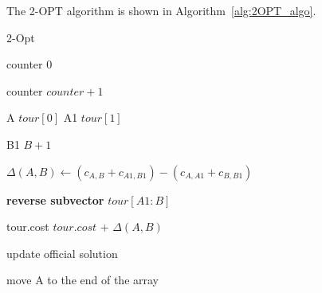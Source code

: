 %         
%         

\newpage

\noindent The 2-OPT algorithm is shown in Algorithm~\ref{alg:2OPT_algo}.

\begin{algorithm}[H]
    \caption{2-Opt}
    \label{alg:2OPT_algo}
    \begin{spacing}{1.3}
        \BlankLine
        counter \leftarrow $0$\;

        {
            counter \leftarrow $counter + 1$\;

            A \leftarrow $tour[0]$\;
            A1 \leftarrow $tour[1]$\;
            \BlankLine
            {
                B1 \leftarrow $B + 1$\;

                $\Delta(A,B) \leftarrow (c_{A,B} + c_{A1,B1}) - (c_{A,A1} + c_{B,B1})$\;
                \BlankLine
                {
                    \textbf{reverse subvector} $tour[A1 : B]$

                    tour.cost \leftarrow $tour.cost$ + $\Delta(A,B)$

                    {
                        update official solution\;
                    }
                }
            }
            \BlankLine
            move A to the end of the array\;
        }
        \BlankLine
    \end{spacing}
\end{algorithm}

